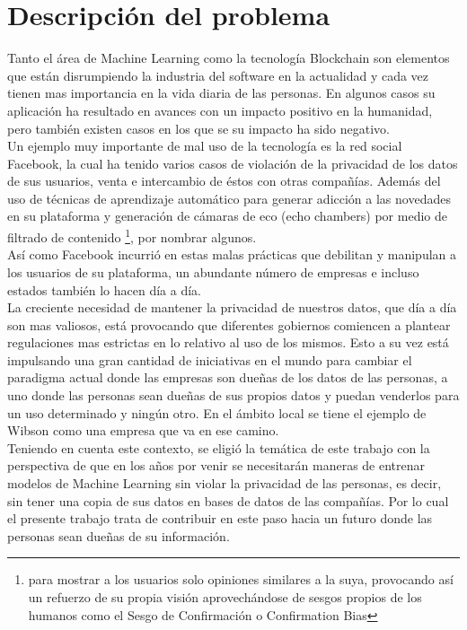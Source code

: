 \documentclass[
11pt, %
oneside, %
spanish, %
singlespacing, %
headsepline, %
chapterinoneline, %
]{MastersDoctoralThesis} %
\begin{document}
\chapter{Descripci\'on del problema}

Tanto el área de Machine Learning como la tecnología Blockchain son elementos que están disrumpiendo la industria del software en la actualidad y cada vez tienen mas importancia en la vida diaria de las personas. En algunos casos su aplicación ha resultado en avances con un impacto positivo en la humanidad, pero también existen casos en los que se su impacto ha sido negativo. \\

Un ejemplo muy importante de mal uso de la tecnología es la red social Facebook, la cual ha tenido varios casos de violación de la privacidad de los datos de sus usuarios, venta e intercambio de éstos con otras compañías. Además del uso de técnicas de aprendizaje automático para generar adicción a las novedades en su plataforma y generación de cámaras de eco (echo chambers) por medio de filtrado de contenido \footnote{para mostrar a los usuarios solo opiniones similares a la suya, provocando así un refuerzo de su propia visión aprovechándose de sesgos propios de los humanos como el Sesgo de Confirmación o Confirmation Bias}, por nombrar algunos. \\

Así como Facebook incurrió en estas malas prácticas que debilitan y manipulan a los usuarios de su plataforma, un abundante número de empresas e incluso estados también lo hacen día a día. \\

La creciente necesidad de mantener la privacidad de nuestros datos, que día a día son mas valiosos, está provocando que diferentes gobiernos comiencen a plantear regulaciones mas estrictas en lo relativo al uso de los mismos.
Esto a su vez está impulsando una gran cantidad de iniciativas en el mundo para cambiar el paradigma actual donde las empresas son dueñas de los datos de las personas, a uno donde las personas sean dueñas de sus propios datos y puedan venderlos para un uso determinado y ningún otro. En el ámbito local se tiene el ejemplo de Wibson como una empresa que va en ese camino. \\

Teniendo en cuenta este contexto, se eligió la temática de este trabajo con la perspectiva de que en los años por venir se necesitarán maneras de entrenar modelos de Machine Learning sin violar la privacidad de las personas, es decir, sin tener una copia de sus datos en bases de datos de las compañías. Por lo cual el presente trabajo trata de contribuir en este paso hacia un futuro donde las personas sean dueñas de su información. 
\end{document}
